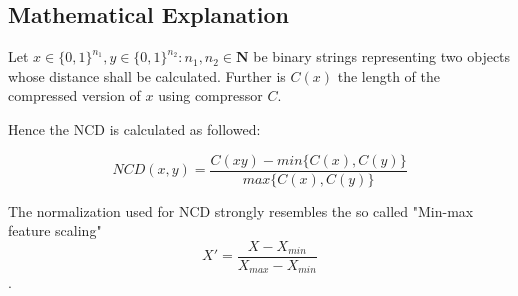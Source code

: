 \subsection{Mathematical Explanation}

Let $x \in \{0,1\}^{n_{1}}, y \in \{0,1\}^{n_{2}} : n_{1}, n_{2} \in \mathbf{N}$ be binary strings representing two objects whose distance shall be calculated. Further is $C(x)$ the length of the compressed version of $x$ using compressor $C$.

Hence the NCD is calculated as followed:

$$ NCD(x,y) = \frac{C(xy) - min\{ C(x), C(y) \}}{max\{C(x), C(y) \}} $$



The normalization used for NCD strongly resembles the so called "Min-max feature scaling" $$X' = \frac{X - X_{min}}{X_{max} - X_{min}}$$.



